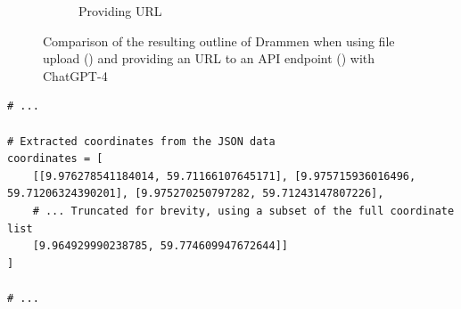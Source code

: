 \begin{figure}
\begin{subfigure}{0.45\textwidth}
        \caption{Providing URL}
        \label{subfig:drammen-outline-api}
    \end{subfigure}
    \caption{Comparison of the resulting outline of Drammen when using file upload () and providing an URL to an API endpoint () with ChatGPT-4}
    \label{fig:file-upload-api-comparison}
\end{figure}

\begin{minipage}{\linewidth}
    \begin{lstlisting}[style=python, caption=ChatGPT code that truncates coordinates, label=lst:python-for-failed-drammen-outline]
# ...

# Extracted coordinates from the JSON data
coordinates = [
    [[9.976278541184014, 59.71166107645171], [9.975715936016496, 59.71206324390201], [9.975270250797282, 59.71243147807226], 
    # ... Truncated for brevity, using a subset of the full coordinate list
    [9.964929990238785, 59.774609947672644]]
]

# ...
\end{lstlisting}
\end{minipage}


\glsresetall
